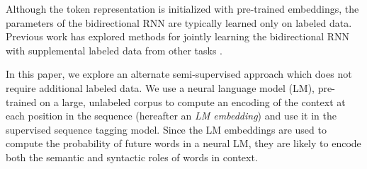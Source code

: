 \documentclass[11pt,a4paper]{article}
\newcommand\wadelete[1]{}
\newcommand\waadd[1]{#1}
\begin{document}
Although the token representation is initialized with pre-trained embeddings, the parameters of the bidirectional RNN are typically learned only on labeled data.
Previous work has explored methods for jointly learning the bidirectional RNN with supplemental labeled data from other tasks \citep[e.g.,][]{Sgaard2016DeepML,yang-transfer-iclr07}.






In this paper, we explore an alternate semi-supervised approach which does not require additional labeled data.
We use a neural language model (LM), pre-trained on a large, unlabeled corpus to compute an encoding of the context at each position in the sequence (hereafter an \textit{LM embedding}) and use it in the supervised sequence tagging model.
Since the LM embeddings are used to compute the probability of future words in a neural LM, they are likely to encode both the semantic and syntactic roles of words in context.
\end{document}
